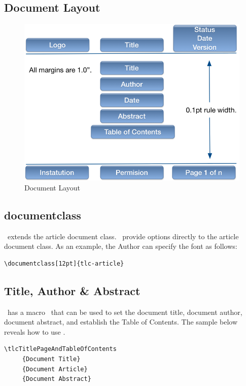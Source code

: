 \documentclass[12pt]{tlc-article}
\begin{document}
\subsection{Document Layout}
\begin{figure}[h]
  \centering
  \includegraphics{images/titlepage.png}
  \caption{Document Layout}
  \label{fig:layout}
\end{figure}

\subsection{documentclass \tlcA}
\tlcA\ extends the article document class.  \tlcA\ provide options directly to
the article document class.  As an example, the Author can specify the font as
follows:

\begin{lstlisting}[basicstyle=\tiny]
  \documentclass[12pt]{tlc-article}
\end{lstlisting}

\subsection{Title, Author \& Abstract} \label{sec:TAA}
\tlcA\ has a macro \tlcTOC\ that can be used to set the document title, document
author, document abstract, and establish the Table of Contents.  The sample
below reveals how to use \tlcTOC.

\begin{lstlisting}[basicstyle=\tiny]
  \tlcTitlePageAndTableOfContents
     {Document Title}
     {Document Article}
     {Document Abstract}
\end{lstlisting}
\end{document}
